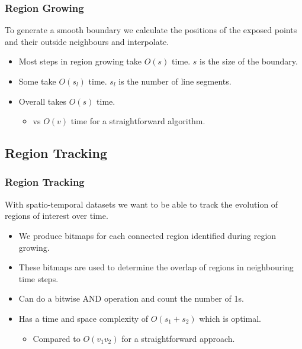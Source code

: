 \documentclass[11pt]{beamer}
\begin{document}
\begin{frame}
	\frametitle{Region Growing}

	To generate a smooth boundary we calculate the positions of the exposed points and their outside neighbours and interpolate.
	\pause
	\begin{itemize}
		\item Most steps in region growing take $O(s)$ time. $s$ is the size of the boundary.
		\pause
		\item Some take $O(s_l)$ time. $s_l$ is the number of line segments.
		\pause
		\item Overall takes $O(s)$ time.
		\begin{itemize}
			\item vs $O(v)$ time for a straightforward algorithm.
		\end{itemize}
	\end{itemize}
\end{frame}

\subsection[Region Tracking]{Region Tracking}
\begin{frame}
	\frametitle{Region Tracking}

	With spatio-temporal datasets we want to be able to track the evolution of regions of interest over time.

	\pause
	\begin{itemize}
		\item We produce bitmaps for each connected region identified during region growing.
		\pause
		\item These bitmaps are used to determine the overlap of regions in neighbouring time steps.
		\pause
		\item Can do a bitwise AND operation and count the number of 1s.
		\pause
		\item Has a time and space complexity of $O(s_1 + s_2)$ which is optimal.
		\begin{itemize}
			\item Compared to $O(v_1 v_2)$ for a straightforward approach.
		\end{itemize}
	\end{itemize}
\end{frame}
\end{document}
